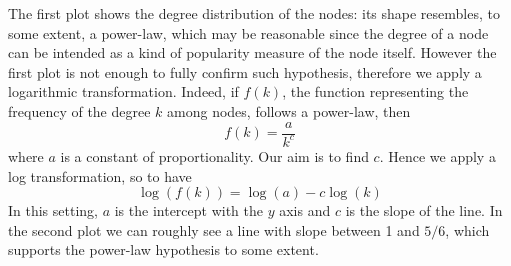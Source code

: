 \documentclass{report}
\theoremstyle{definition}
\theoremstyle{remark}
\begin{document}
The first plot shows the degree distribution of the nodes: its shape resembles, to some extent, a power-law, which may be reasonable since the degree of a node can be intended as a kind of popularity measure of the node itself. However the first plot is not enough to fully confirm such hypothesis, therefore we apply a logarithmic transformation. Indeed, if $f(k)$, the function representing the frequency of the degree $k$ among nodes, follows a power-law, then
\begin{equation*}
f(k)  = \frac{a}{k^c}
\end{equation*}
where $a$ is a constant of proportionality. Our aim is to find $c$. Hence we apply a log transformation, so to have
\begin{equation*}
\log(f(k)) = \log(a) -c \log(k)
\end{equation*}
In this setting, $a$ is the intercept with the $y$ axis and $c$ is the slope of the line. In the second plot we can roughly see a line with slope between 1 and $5/6$, which supports the power-law hypothesis to some extent.
\end{document}
